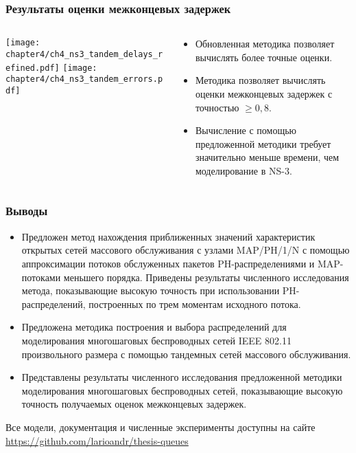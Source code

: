 \begin{frame}
    \frametitle{Результаты оценки межконцевых задержек}
    \begin{columns}
        \begin{column}{0.65\textwidth}
            \texttt{[image: chapter4/ch4\_ns3\_tandem\_delays\_refined.pdf]}
            \texttt{[image: chapter4/ch4\_ns3\_tandem\_errors.pdf]}
        \end{column}
        \begin{column}{0.32\textwidth}
            \footnotesize
            \begin{itemize}
                \item Обновленная методика позволяет вычислять более точные оценки.
                \item Методика позволяет вычислять оценки межконцевых задержек с точностью $ \geqslant 0,8$.
                \item Вычисление с помощью предложенной методики требует значительно меньше времени, чем моделирование в NS-3.
            \end{itemize}
        \end{column}
    \end{columns}
\end{frame}

\begin{frame}
    \frametitle{Выводы}
    \small
    \begin{itemize}
        \item Предложен метод нахождения приближенных значений характеристик открытых сетей массового обслуживания с узлами MAP/PH/1/N с помощью аппроксимации потоков обслуженных пакетов PH-распределениями и MAP-потоками меньшего порядка. Приведены результаты численного исследования метода, показывающие высокую точность при использовании PH-распределений, построенных по трем моментам исходного потока.
        \item Предложена методика построения и выбора распределений для моделирования многошаговых беспроводных сетей IEEE 802.11 произвольного размера с помощью тандемных сетей массового обслуживания.
        \item Представлены результаты численного исследования предложенной методики моделирования многошаговых беспроводных сетей, показывающие высокую точность получаемых оценок межконцевых задержек.
    \end{itemize}
    \footnotesize
    Все модели, документация и численные эксперименты доступны на сайте \url{https://github.com/larioandr/thesis-queues}
\end{frame}


